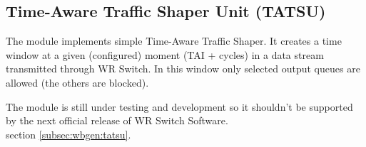 \subsection{Time-Aware Traffic Shaper Unit (TATSU)}


The module implements simple Time-Aware Traffic Shaper. It creates a time window
at a given (configured) moment (TAI + cycles) in a data stream transmitted
through WR Switch. In this window only selected output queues are allowed (the
others are blocked).

The module is still under testing and development so it
shouldn't be supported by the next official release of WR Switch Software.\\

 section \ref{subsec:wbgen:tatsu}.
